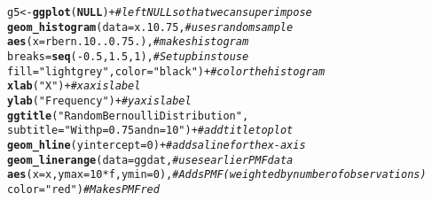 \documentclass{article}\usepackage[]{graphicx}\usepackage[]{color}
\makeatletter
\newcommand{\hlnum}[1]{\textcolor[rgb]{0.686,0.059,0.569}{#1}}%
\newcommand{\hlstr}[1]{\textcolor[rgb]{0.192,0.494,0.8}{#1}}%
\newcommand{\hlcom}[1]{\textcolor[rgb]{0.678,0.584,0.686}{\textit{#1}}}%
\newcommand{\hlopt}[1]{\textcolor[rgb]{0,0,0}{#1}}%
\newcommand{\hlstd}[1]{\textcolor[rgb]{0.345,0.345,0.345}{#1}}%
\newcommand{\hlkwa}[1]{\textcolor[rgb]{0.161,0.373,0.58}{\textbf{#1}}}%
\newcommand{\hlkwb}[1]{\textcolor[rgb]{0.69,0.353,0.396}{#1}}%
\newcommand{\hlkwc}[1]{\textcolor[rgb]{0.333,0.667,0.333}{#1}}%
\newcommand{\hlkwd}[1]{\textcolor[rgb]{0.737,0.353,0.396}{\textbf{#1}}}%
\newenvironment{kframe}{%
 \def\at@end@of@kframe{}%
 \ifinner\ifhmode%
  \def\at@end@of@kframe{\end{minipage}}%
  \begin{minipage}{\columnwidth}%
 \fi\fi%
 \def\FrameCommand##1{\hskip\@totalleftmargin \hskip-\fboxsep
 \colorbox{shadecolor}{##1}\hskip-\fboxsep
     \hskip-\linewidth \hskip-\@totalleftmargin \hskip\columnwidth}%
 \MakeFramed {\advance\hsize-\width
   \@totalleftmargin\z@ \linewidth\hsize
   \@setminipage}}%
 {\par\unskip\endMakeFramed%
 \at@end@of@kframe}
\newenvironment{knitrout}{}{} %
\makeatother
\begin{document}
\begin{enumerate}
\begin{knitrout}
\begin{kframe}
\begin{alltt}
\hlstd{g5}\hlkwb{<-}\hlkwd{ggplot}\hlstd{(}\hlkwa{NULL}\hlstd{)} \hlopt{+}                                      \hlcom{#left NULL so that we can superimpose}
  \hlkwd{geom_histogram}\hlstd{(}\hlkwc{data}\hlstd{=x.10.75,}                          \hlcom{#uses random sample}
                 \hlkwd{aes}\hlstd{(}\hlkwc{x}\hlstd{=rbern.10..0.75.),}                \hlcom{#makes histogram}
                 \hlkwc{breaks}\hlstd{=}\hlkwd{seq}\hlstd{(}\hlopt{-}\hlnum{0.5}\hlstd{,}\hlnum{1.5}\hlstd{,}\hlnum{1}\hlstd{),}                \hlcom{#Set up bins to use}
                 \hlkwc{fill} \hlstd{=} \hlstr{"lightgrey"}\hlstd{,} \hlkwc{color}\hlstd{=}\hlstr{"black"}\hlstd{)} \hlopt{+}   \hlcom{#color the histogram}
  \hlkwd{xlab}\hlstd{(}\hlstr{"X"}\hlstd{)} \hlopt{+}                                           \hlcom{#x axis label}
  \hlkwd{ylab}\hlstd{(}\hlstr{"Frequency"}\hlstd{)}\hlopt{+}                                    \hlcom{#y axis label}
  \hlkwd{ggtitle}\hlstd{(}\hlstr{"Random Bernoulli Distribution"}\hlstd{,}
          \hlkwc{subtitle} \hlstd{=} \hlstr{"With p=0.75 and n=10"}\hlstd{)} \hlopt{+}          \hlcom{#add title to plot}
  \hlkwd{geom_hline}\hlstd{(}\hlkwc{yintercept}\hlstd{=}\hlnum{0}\hlstd{)} \hlopt{+}                            \hlcom{#adds a line for the x-axis}
  \hlkwd{geom_linerange}\hlstd{(}\hlkwc{data}\hlstd{=ggdat,}                            \hlcom{#uses earlier PMF data}
                 \hlkwd{aes}\hlstd{(}\hlkwc{x}\hlstd{=x,} \hlkwc{ymax}\hlstd{=}\hlnum{10}\hlopt{*}\hlstd{f,} \hlkwc{ymin}\hlstd{=}\hlnum{0}\hlstd{),}           \hlcom{#Adds PMF (weighted by number of observations)}
                 \hlkwc{color}\hlstd{=}\hlstr{"red"}\hlstd{)}                           \hlcom{#Makes PMF red}


\end{alltt}
\end{kframe}
\end{knitrout}
\end{enumerate}
\end{document}
